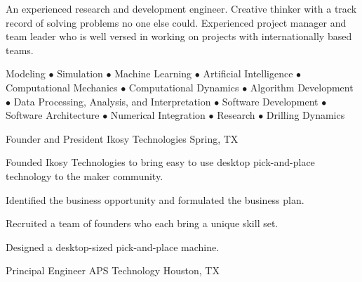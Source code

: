 \documentclass{leresume}
\begin{document}
	\thispagestyle{lefooterhorizontalline}
	\makeresumeheaderC
	
	An experienced research and development engineer. Creative thinker with a track record of solving problems no one else could. Experienced project manager and team leader who is well versed in working on projects with internationally based teams.

	Modeling $\bullet$ Simulation $\bullet$ Machine Learning $\bullet$ Artificial Intelligence $\bullet$ Computational Mechanics $\bullet$ Computational Dynamics $\bullet$ Algorithm Development $\bullet$ Data Processing, Analysis, and Interpretation $\bullet$ Software Development $\bullet$ Software Architecture $\bullet$ Numerical Integration $\bullet$ Research $\bullet$ Drilling Dynamics

    
            {Founder and President}
            {Ikosy Technologies}
			{Spring, TX}
			
					\noindent Founded Ikosy Technologies to bring easy to use desktop pick-and-place technology to the maker community.
		\begin{bulletedlist}
			
		\item 
					Identified the business opportunity and formulated the business plan.
				
		\item 
					Recruited a team of founders who each bring a unique skill set.
				
		\item 
					Designed a desktop-sized pick-and-place machine.
				
		\end{bulletedlist}
	
            {Principal Engineer}
            {APS Technology}
			{Houston, TX}
			
\end{document}
